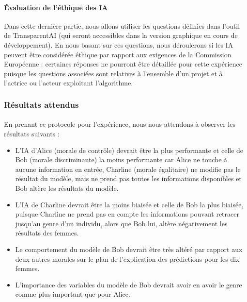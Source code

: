 \documentclass[10pt, french, a4paper]{report}
\begin{document}
\paragraph{\uppercase{é}valuation de l'éthique des IA} Dans cette dernière partie, nous allons utiliser les questions définies dans l'outil de TransparentAI (qui seront accessibles dans la version graphique en cours de développement). En nous basant sur ces questions, nous déroulerons si les IA peuvent être considérée éthique par rapport aux exigences de la Commission Européenne : certaines réponses ne pourront être détaillée pour cette expérience puisque les questions associées sont relatives à l'ensemble d'un projet et à l'actrice ou l'acteur exploitant l'algorithme.


\subsubsection{Résultats attendus} 

\paragraph{}
En prenant ce protocole pour l'expérience, nous nous attendons à observer les résultats suivants :

\begin{itemize}
  \item L'IA d'Alice (morale de contrôle) devrait être la plus performante et celle de Bob (morale discriminante) la moins performante car Alice ne touche à aucune information en entrée, Charline (morale égalitaire) ne modifie pas le résultat du modèle, mais ne prend pas toutes les informations disponibles et Bob altère les résultats du modèle.
  \item L'IA de Charline devrait être la moins biaisée et celle de Bob la plus biaisée, puisque Charline ne prend pas en compte les informations pouvant retracer jusqu'au genre d'un individu, alors que Bob lui, altère négativement les résultats des femmes.
  \item Le comportement du modèle de Bob devrait être très altéré par rapport aux deux autres morales sur le plan de l'explication des prédictions pour les dix femmes.
  \item L'importance des variables du modèle de Bob devrait avoir en avoir le genre comme plus important que pour Alice.
\end{itemize}
\end{document}

